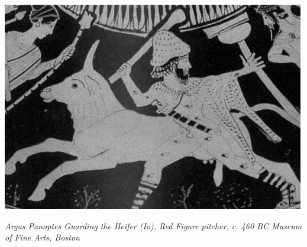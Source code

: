\begin{center}
	\includegraphics[width=0.75\linewidth]{immagini/argus2.png}

	\emph{Argus Panoptes Guarding the Heifer (Io), Red Figure pitcher, c. 460 BC Museum of Fine Arts, Boston}
\end{center}

\pagebreak

